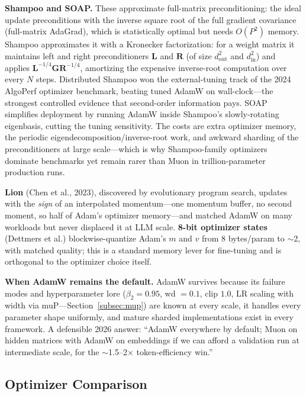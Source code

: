 \textbf{Shampoo and SOAP.} These approximate full-matrix preconditioning: the ideal update preconditions with the inverse square root of the full gradient covariance (full-matrix AdaGrad), which is statistically optimal but needs $O(P^2)$ memory. Shampoo approximates it with a Kronecker factorization: for a weight matrix it maintains left and right preconditioners $\mathbf{L}$ and $\mathbf{R}$ (of size $d_{\text{out}}^2$ and $d_{\text{in}}^2$) and applies $\mathbf{L}^{-1/4} \mathbf{G} \mathbf{R}^{-1/4}$, amortizing the expensive inverse-root computation over every $N$ steps. Distributed Shampoo won the external-tuning track of the 2024 AlgoPerf optimizer benchmark, beating tuned AdamW on wall-clock---the strongest controlled evidence that second-order information pays. SOAP simplifies deployment by running AdamW inside Shampoo's slowly-rotating eigenbasis, cutting the tuning sensitivity. The costs are extra optimizer memory, the periodic eigendecomposition/inverse-root work, and awkward sharding of the preconditioners at large scale---which is why Shampoo-family optimizers dominate benchmarks yet remain rarer than Muon in trillion-parameter production runs.

\textbf{Lion} (Chen et al., 2023), discovered by evolutionary program search, updates with the \emph{sign} of an interpolated momentum---one momentum buffer, no second moment, so half of Adam's optimizer memory---and matched AdamW on many workloads but never displaced it at LLM scale. \textbf{8-bit optimizer states} (Dettmers et al.) blockwise-quantize Adam's $m$ and $v$ from 8 bytes/param to $\sim$2, with matched quality; this is a standard memory lever for fine-tuning and is orthogonal to the optimizer choice itself.

\textbf{When AdamW remains the default.} AdamW survives because its failure modes and hyperparameter lore ($\beta_2 = 0.95$, wd $= 0.1$, clip $1.0$, LR scaling with width via muP---Section~\ref{subsec:mup}) are known at every scale, it handles every parameter shape uniformly, and mature sharded implementations exist in every framework. A defensible 2026 answer: ``AdamW everywhere by default; Muon on hidden matrices with AdamW on embeddings if we can afford a validation run at intermediate scale, for the $\sim$1.5--2$\times$ token-efficiency win.''

\subsection{Optimizer Comparison}

